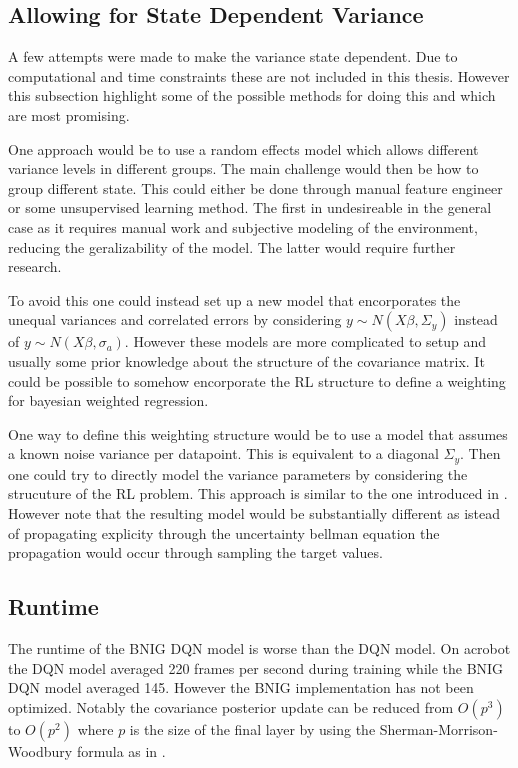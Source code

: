 \subsection{Allowing for State Dependent Variance}

A few attempts were made to make the variance state dependent. Due to computational and time constraints these are not included in this thesis. However this subsection highlight some of the possible methods for doing this and which are most promising.

One approach would be to use a random effects model\citep[p.~382-383]{gelman_2013} which allows different variance levels in different groups. The main challenge would then be how to group different state. This could either be done through manual feature engineer or some unsupervised learning method. The first in undesireable in the general case as it requires manual work and subjective modeling of the environment, reducing the geralizability of the model. The latter would require further research.

To avoid this one could instead set up a new model that encorporates the unequal variances and correlated errors by considering $y \sim N(X\beta, \Sigma_y)$ instead of $y \sim N(X\beta, \sigma_a)$.  However these models are more complicated to setup and usually some prior knowledge about the structure of the covariance matrix. It could be possible to somehow encorporate the RL structure to define a weighting for bayesian weighted regression\citep[p.~370-373]{gelman_2013}. 

One way to define this weighting structure would be to use a model that assumes a known noise variance per datapoint. This is equivalent to a diagonal $\Sigma_y$. Then one could try to directly model the variance parameters by considering the strucuture of the RL problem. This approach is similar to the one introduced in \cite{donoghue_2017}. However note that the resulting model would be substantially different as istead of propagating explicity through the uncertainty bellman equation the propagation would occur through sampling the target values.

\subsection{Runtime}

The runtime of the BNIG DQN model is worse than the DQN model. On acrobot the DQN model averaged 220 frames per second during training while the BNIG DQN model averaged 145. However the BNIG implementation has not been optimized. Notably the covariance posterior update can be reduced from $O(p^3)$ to $O(p^2)$ where $p$ is the size of the final layer by using the Sherman-Morrison-Woodbury formula as in \cite{donoghue_2017}.

